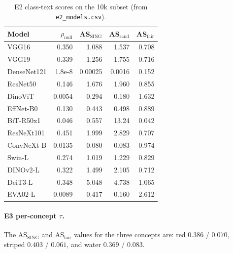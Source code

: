 \documentclass[10pt,twocolumn]{article}
\begin{document}
\begin{table}[h]
\centering
\scriptsize
\setlength{\tabcolsep}{2.5pt}
\begin{tabular}{@{}lrrrr@{}}
\toprule
Model & $\rho_{\mathrm{null}}$ & AS$_{\mathrm{SING}}$ & AS$_{\mathrm{rand}}$ & AS$_{\mathrm{fair}}$ \\
\midrule
VGG16       & 0.350 & 1.088 & 1.537 & 0.708 \\
VGG19       & 0.339 & 1.256 & 1.755 & 0.716 \\
DenseNet121 & 1.8e-8 & 0.00025 & 0.0016 & 0.152 \\
ResNet50    & 0.146 & 1.676 & 1.960 & 0.855 \\
DinoViT     & 0.0054 & 0.294 & 0.180 & 1.632 \\
EffNet-B0   & 0.130 & 0.443 & 0.498 & 0.889 \\
BiT-R50x1   & 0.046 & 0.557 & 13.24 & 0.042 \\
ResNeXt101  & 0.451 & 1.999 & 2.829 & 0.707 \\
ConvNeXt-B  & 0.0135 & 0.080 & 0.083 & 0.974 \\
Swin-L      & 0.274 & 1.019 & 1.229 & 0.829 \\
DINOv2-L    & 0.322 & 1.499 & 2.105 & 0.712 \\
DeiT3-L     & 0.348 & 5.048 & 4.738 & 1.065 \\
EVA02-L     & 0.0089 & 0.417 & 0.160 & 2.612 \\
\bottomrule
\end{tabular}
\vspace{-0.3em}
\caption{E2 class-text scores on the 10k subset (from \texttt{e2\_models.csv}).}
\label{tab:e2models}
\end{table}

\paragraph{E3 per-concept $\tau$.}
The AS$_{\mathrm{SING}}$ and AS$_{\mathrm{fair}}$ values for the three concepts are: red $0.386$ / $0.070$, striped $0.403$ / $0.061$, and water $0.369$ / $0.083$.
\end{document}
